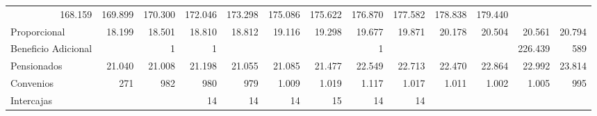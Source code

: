 \begin{tabular}{lllllllllllll}
  \multicolumn{1}{r}{168.159} &
  \multicolumn{1}{r}{169.899} &
  \multicolumn{1}{r}{170.300} &
  \multicolumn{1}{r}{172.046} &
  \multicolumn{1}{r}{173.298} &
  \multicolumn{1}{r}{175.086} &
  \multicolumn{1}{r}{175.622} &
  \multicolumn{1}{r}{176.870} &
  \multicolumn{1}{r}{177.582} &
  \multicolumn{1}{r}{178.838} &
  \multicolumn{1}{r}{179.440} \\
\multicolumn{1}{l}{\hspace{1em}Proporcional} &
  \multicolumn{1}{|r}{18.199} &
  \multicolumn{1}{r}{18.501} &
  \multicolumn{1}{r}{18.810} &
  \multicolumn{1}{r}{18.812} &
  \multicolumn{1}{r}{19.116} &
  \multicolumn{1}{r}{19.298} &
  \multicolumn{1}{r}{19.677} &
  \multicolumn{1}{r}{19.871} &
  \multicolumn{1}{r}{20.178} &
  \multicolumn{1}{r}{20.504} &
  \multicolumn{1}{r}{20.561} &
  \multicolumn{1}{r}{20.794} \\
\multicolumn{1}{l}{\hspace{1em}Beneficio Adicional} &
  \multicolumn{1}{|r}{} &
  \multicolumn{1}{r}{1} &
  \multicolumn{1}{r}{1} &
  \multicolumn{1}{r}{} &
  \multicolumn{1}{r}{} &
  \multicolumn{1}{r}{} &
  \multicolumn{1}{r}{1} &
  \multicolumn{1}{r}{} &
  \multicolumn{1}{r}{} &
  \multicolumn{1}{r}{} &
  \multicolumn{1}{r}{226.439} &
  \multicolumn{1}{r}{589} \\
\multicolumn{1}{l}{\hspace{1em}Pensionados} &
  \multicolumn{1}{|r}{21.040} &
  \multicolumn{1}{r}{21.008} &
  \multicolumn{1}{r}{21.198} &
  \multicolumn{1}{r}{21.055} &
  \multicolumn{1}{r}{21.085} &
  \multicolumn{1}{r}{21.477} &
  \multicolumn{1}{r}{22.549} &
  \multicolumn{1}{r}{22.713} &
  \multicolumn{1}{r}{22.470} &
  \multicolumn{1}{r}{22.864} &
  \multicolumn{1}{r}{22.992} &
  \multicolumn{1}{r}{23.814} \\
\multicolumn{1}{l}{\hspace{1em}Convenios} &
  \multicolumn{1}{|r}{271} &
  \multicolumn{1}{r}{982} &
  \multicolumn{1}{r}{980} &
  \multicolumn{1}{r}{979} &
  \multicolumn{1}{r}{1.009} &
  \multicolumn{1}{r}{1.019} &
  \multicolumn{1}{r}{1.117} &
  \multicolumn{1}{r}{1.017} &
  \multicolumn{1}{r}{1.011} &
  \multicolumn{1}{r}{1.002} &
  \multicolumn{1}{r}{1.005} &
  \multicolumn{1}{r}{995} \\
\multicolumn{1}{l}{\hspace{1em}Intercajas} &
  \multicolumn{1}{|r}{} &
  \multicolumn{1}{r}{} &
  \multicolumn{1}{r}{14} &
  \multicolumn{1}{r}{14} &
  \multicolumn{1}{r}{14} &
  \multicolumn{1}{r}{15} &
  \multicolumn{1}{r}{14} &
  \multicolumn{1}{r}{14} &

\end{tabular}
